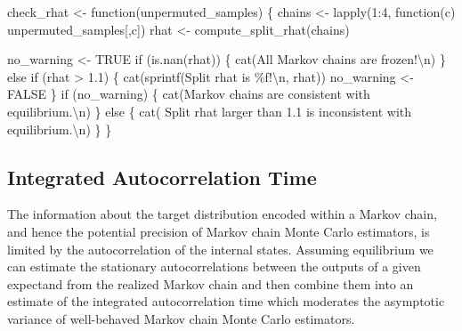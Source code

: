 \documentclass[
  letterpaper,
  DIV=11,
  numbers=noendperiod]{scrartcl}
\newenvironment{Shaded}{\begin{snugshade}}{\end{snugshade}}
\newcommand{\ConstantTok}[1]{\textcolor[rgb]{0.56,0.35,0.01}{#1}}
\newcommand{\ControlFlowTok}[1]{\textcolor[rgb]{0.00,0.23,0.31}{#1}}
\newcommand{\DecValTok}[1]{\textcolor[rgb]{0.68,0.00,0.00}{#1}}
\newcommand{\FloatTok}[1]{\textcolor[rgb]{0.68,0.00,0.00}{#1}}
\newcommand{\FunctionTok}[1]{\textcolor[rgb]{0.28,0.35,0.67}{#1}}
\newcommand{\NormalTok}[1]{\textcolor[rgb]{0.00,0.23,0.31}{#1}}
\newcommand{\OtherTok}[1]{\textcolor[rgb]{0.00,0.23,0.31}{#1}}
\newcommand{\SpecialCharTok}[1]{\textcolor[rgb]{0.37,0.37,0.37}{#1}}
\newcommand{\StringTok}[1]{\textcolor[rgb]{0.13,0.47,0.30}{#1}}
\begin{document}
\begin{Shaded}
\begin{Highlighting}[]
\NormalTok{check\_rhat }\OtherTok{\textless{}{-}} \ControlFlowTok{function}\NormalTok{(unpermuted\_samples) \{}
\NormalTok{  chains }\OtherTok{\textless{}{-}} \FunctionTok{lapply}\NormalTok{(}\DecValTok{1}\SpecialCharTok{:}\DecValTok{4}\NormalTok{, }\ControlFlowTok{function}\NormalTok{(c) unpermuted\_samples[,c])}
\NormalTok{  rhat }\OtherTok{\textless{}{-}} \FunctionTok{compute\_split\_rhat}\NormalTok{(chains)}

\NormalTok{  no\_warning }\OtherTok{\textless{}{-}} \ConstantTok{TRUE}
  \ControlFlowTok{if}\NormalTok{ (}\FunctionTok{is.nan}\NormalTok{(rhat)) \{}
    \FunctionTok{cat}\NormalTok{(}\StringTok{\textquotesingle{}All Markov chains are frozen!}\SpecialCharTok{\textbackslash{}n}\StringTok{\textquotesingle{}}\NormalTok{)}
\NormalTok{  \} }\ControlFlowTok{else} \ControlFlowTok{if}\NormalTok{ (rhat }\SpecialCharTok{\textgreater{}} \FloatTok{1.1}\NormalTok{) \{}
    \FunctionTok{cat}\NormalTok{(}\FunctionTok{sprintf}\NormalTok{(}\StringTok{\textquotesingle{}Split rhat is \%f!}\SpecialCharTok{\textbackslash{}n}\StringTok{\textquotesingle{}}\NormalTok{, rhat))}
\NormalTok{    no\_warning }\OtherTok{\textless{}{-}} \ConstantTok{FALSE}
\NormalTok{  \}}
  \ControlFlowTok{if}\NormalTok{ (no\_warning) \{}
    \FunctionTok{cat}\NormalTok{(}\StringTok{\textquotesingle{}Markov chains are consistent with equilibrium.}\SpecialCharTok{\textbackslash{}n}\StringTok{\textquotesingle{}}\NormalTok{)}
\NormalTok{  \} }\ControlFlowTok{else}\NormalTok{ \{}
    \FunctionTok{cat}\NormalTok{(}\StringTok{\textquotesingle{}  Split rhat larger than 1.1 is inconsistent with equilibrium.}\SpecialCharTok{\textbackslash{}n}\StringTok{\textquotesingle{}}\NormalTok{)}
\NormalTok{  \}}
\NormalTok{\}}
\end{Highlighting}
\end{Shaded}

\hypertarget{integrated-autocorrelation-time}{%
\subsection{Integrated Autocorrelation
Time}\label{integrated-autocorrelation-time}}

The information about the target distribution encoded within a Markov
chain, and hence the potential precision of Markov chain Monte Carlo
estimators, is limited by the autocorrelation of the internal states.
Assuming equilibrium we can estimate the stationary autocorrelations
between the outputs of a given expectand from the realized Markov chain
and then combine them into an estimate of the integrated autocorrelation
time which moderates the asymptotic variance of well-behaved Markov
chain Monte Carlo estimators.
\end{document}
